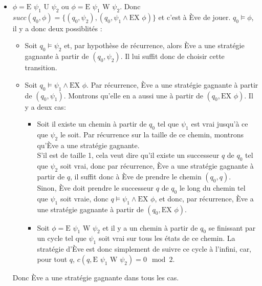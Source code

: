 \documentclass[10pt,a4paper]{article}
\begin{document}
\begin{itemize}
\item $\phi = \mbox{E } \psi_1 \mbox{ U } \psi_2$ ou $\phi = \mbox{E } \psi_1 \mbox{ W } \psi_2$. Donc $succ(q_0,\phi) = \{ (q_0,\psi_2), (q_0,\psi_1 \land \mbox{EX } \phi) \}$ et c'est à Ève de jouer. $q_0 \vDash \phi$, il y a donc deux possiblités :
\begin{itemize}
	\item Soit $q_0 \vDash \psi_2$ et, par hypothèse de récurrence, alors Ève a une stratégie gagnante à partir de $(q_0,\psi_2)$. Il lui suffit donc de choisir cette transition.
	\item Soit $q_0 \vDash \psi_1 \land \mbox{EX } \phi$.
	Par récurrence, Ève a une stratégie gagnante à partir de $(q_0,\psi_1)$.
	Montrons qu'elle en a aussi une à partir de $(q_0,\mbox{EX } \phi)$.
	Il y a deux cas:
	\begin{itemize}
		\item Soit il existe un chemin à partir de $q_0$ tel que $\psi_1$ est vrai jusqu'à ce que $\psi_2$ le soit. Par récurrence sur la taille de ce chemin, montrons qu'Ève a une stratégie gagnante.\\
		S'il est de taille 1, cela veut dire qu'il existe un successeur $q$ de $q_0$ tel que $\psi_2$ soit vrai, donc par récurrence, Ève a une stratégie gagnante à partir de $q$, il suffit donc à Ève de prendre le chemin $(q_0,q)$.\\
		Sinon, Ève doit prendre le successeur $q$ de $q_0$ le long du chemin tel que $\psi_1$ soit vraie, donc $q \vDash \psi_1 \land \mbox{EX } \phi$, et donc, par récurrence, Ève a une stratégie gagnante à partir de $(q_0,\mbox{EX } \phi)$.
		\item Soit $\phi = \mbox{E } \psi_1 \mbox{ W } \psi_2$ et il y a un chemin à partir de $q_0$ se finissant par un cycle tel que $\psi_1$ soit vrai sur tous les états de ce chemin. La stratégie d'Ève est donc simplement de suivre ce cycle à l'infini, car, pour tout $q$, $c(q,\mbox{E } \psi_1 \mbox{ W } \psi_2) = 0 \mod 2$.
	\end{itemize}
\end{itemize}
Donc Ève a une stratégie gagnante dans tous les cas.


\end{itemize}
\end{document}
